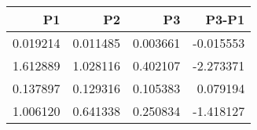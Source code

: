 \begin{tabular}{rrrr}
\toprule
P1 & P2 & P3 & P3-P1 \\
\midrule
0.019214 & 0.011485 & 0.003661 & -0.015553 \\
1.612889 & 1.028116 & 0.402107 & -2.273371 \\
0.137897 & 0.129316 & 0.105383 & 0.079194 \\
1.006120 & 0.641338 & 0.250834 & -1.418127 \\
\bottomrule
\end{tabular}

